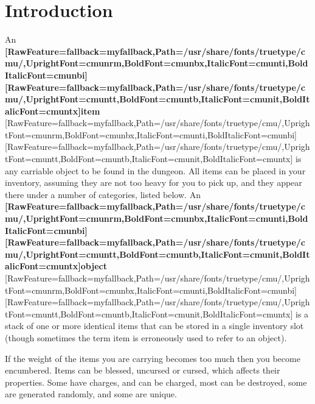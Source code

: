 \chapter{Introduction}
An {\bfseries \allowbreak{}\setmainfont{cmunbx.ttf}[RawFeature={fallback=myfallback},Path=/usr/share/fonts/truetype/cmu/,UprightFont=cmunrm,BoldFont=cmunbx,ItalicFont=cmunti,BoldItalicFont=cmunbi]\setmonofont{cmunbx.ttf}[RawFeature={fallback=myfallback},Path=/usr/share/fonts/truetype/cmu/,UprightFont=cmuntt,BoldFont=cmuntb,ItalicFont=cmunit,BoldItalicFont=cmuntx]\bfseries item}{$\text{ }$}\allowbreak{}\setmainfont{cmunrm.ttf}[RawFeature={fallback=myfallback},Path=/usr/share/fonts/truetype/cmu/,UprightFont=cmunrm,BoldFont=cmunbx,ItalicFont=cmunti,BoldItalicFont=cmunbi]\setmonofont{cmunrm.ttf}[RawFeature={fallback=myfallback},Path=/usr/share/fonts/truetype/cmu/,UprightFont=cmuntt,BoldFont=cmuntb,ItalicFont=cmunit,BoldItalicFont=cmuntx] is any carriable object to be found in the dungeon\footnotemark[2]. All items can be placed in your inventory, assuming they are not too heavy\footnotemark[3] for you to pick up, and they appear there under a number of categories, listed below. An {\bfseries \allowbreak{}\setmainfont{cmunbx.ttf}[RawFeature={fallback=myfallback},Path=/usr/share/fonts/truetype/cmu/,UprightFont=cmunrm,BoldFont=cmunbx,ItalicFont=cmunti,BoldItalicFont=cmunbi]\setmonofont{cmunbx.ttf}[RawFeature={fallback=myfallback},Path=/usr/share/fonts/truetype/cmu/,UprightFont=cmuntt,BoldFont=cmuntb,ItalicFont=cmunit,BoldItalicFont=cmuntx]\bfseries object}{$\text{ }$}\allowbreak{}\setmainfont{cmunrm.ttf}[RawFeature={fallback=myfallback},Path=/usr/share/fonts/truetype/cmu/,UprightFont=cmunrm,BoldFont=cmunbx,ItalicFont=cmunti,BoldItalicFont=cmunbi]\setmonofont{cmunrm.ttf}[RawFeature={fallback=myfallback},Path=/usr/share/fonts/truetype/cmu/,UprightFont=cmuntt,BoldFont=cmuntb,ItalicFont=cmunit,BoldItalicFont=cmuntx] is a stack of one or more identical items that can be stored in a single inventory slot (though sometimes the term \textquotesingle{}item\textquotesingle{} is erroneously used to refer to an object).

If the weight of the items you are carrying becomes too much then you become encumbered\footnotemark[4]. Items can be blessed, uncursed or cursed\footnotemark[5], which affects their properties. Some have charges, and can be charged, most can be destroyed, some are generated randomly, and some are unique.

